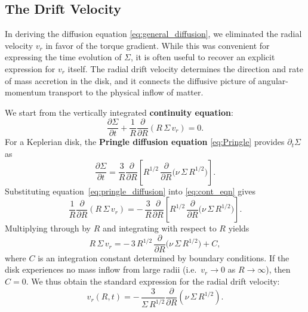 \subsection*{The Drift Velocity}
\par
In deriving the diffusion equation \eqref{eq:general_diffusion}, we eliminated the radial velocity $v_r$ in favor of the torque gradient. While this was convenient for expressing the time evolution of $\Sigma$, it is often useful to recover an explicit expression for $v_r$ itself. The radial drift velocity determines the direction and rate of mass accretion in the disk, and it connects the diffusive picture of angular-momentum transport to the physical inflow of matter.
\par
We start from the vertically integrated \textbf{continuity equation}:
\begin{equation}
\label{eq:cont_eqn}
\frac{\partial \Sigma}{\partial t} 
+ \frac{1}{R}\frac{\partial}{\partial R}\!\left(R\,\Sigma\,v_r\right) = 0.
\end{equation}
For a Keplerian disk, the \textbf{Pringle diffusion equation} \eqref{eq:Pringle} provides $\partial_t \Sigma$ as
\begin{equation}
\label{eq:pringle_diffusion}
\frac{\partial \Sigma}{\partial t}
= \frac{3}{R}\frac{\partial}{\partial R}
\left[
R^{1/2}\,\frac{\partial}{\partial R}\big(\nu\,\Sigma\,R^{1/2}\big)
\right].
\end{equation}
Substituting equation~\eqref{eq:pringle_diffusion} into \eqref{eq:cont_eqn} gives
\begin{equation}
\frac{1}{R}\frac{\partial}{\partial R}\!\left(R\,\Sigma\,v_r\right)
= -\,\frac{3}{R}\frac{\partial}{\partial R}
\left[
R^{1/2}\,\frac{\partial}{\partial R}\big(\nu\,\Sigma\,R^{1/2}\big)
\right].
\end{equation}
Multiplying through by $R$ and integrating with respect to $R$ yields
\begin{equation}
R\,\Sigma\,v_r
= -\,3\,R^{1/2}\,\frac{\partial}{\partial R}\big(\nu\,\Sigma\,R^{1/2}\big)
+ C,
\end{equation}
where $C$ is an integration constant determined by boundary conditions.
If the disk experiences no mass inflow from large radii (i.e.\ $v_r \to 0$ as $R \to \infty$),
then $C=0$. We thus obtain the standard expression for the radial drift velocity:
\begin{equation}
\label{eq:vr_solution}
\boxed{
v_r(R,t)
= -\,\frac{3}{\Sigma\,R^{1/2}}
\frac{\partial}{\partial R}\!\left(\nu\,\Sigma\,R^{1/2}\right).
}
\end{equation}

